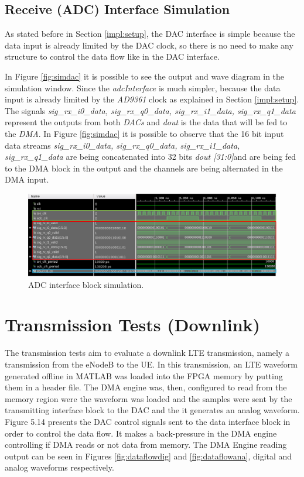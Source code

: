 \subsection{Receive (ADC) Interface Simulation}

As stated before in Section \ref{impl:setup}, the DAC interface is simple
because the data input is already limited by the DAC clock, so there is no need
to make any structure to control the data flow like in the DAC interface.

In Figure \ref{fig:simdac} it is possible to see the output and wave diagram in
the simulation window. Since the \textit{adcInterface} is much simpler, because
the data input is already limited by the \textit{AD9361} clock as explained in
Section \ref{impl:setup}. The signals \textit{sig\_rx\_i0\_data,
sig\_rx\_q0\_data, sig\_rx\_i1\_data, sig\_rx\_q1\_data} represent the outputs
from both \textit{DACs} and \textit{dout} is the data that will be fed to the
\textit{DMA}. In Figure \ref{fig:simdac} it is possible to observe that the 16
bit input data streams \textit{sig\_rx\_i0\_data, sig\_rx\_q0\_data,
sig\_rx\_i1\_data, sig\_rx\_q1\_data} are being concatenated into 32 bits
\textit{dout [31:0]}and are being fed to the DMA block in the output and the
channels are being alternated in the DMA input.

\begin{figure}[htbp]
    \centering
    \includegraphics[width=1\textwidth]{./figures/adcInterface_m}
    \caption{ ADC interface block simulation.
    \label{fig:simadc}}
\end{figure}



\section{Transmission Tests (Downlink)}
\label{result:dac}

The transmission tests aim to evaluate a downlink LTE transmission, namely a
transmission from the eNodeB to the UE. In this transmission, an LTE waveform
generated offline in MATLAB was loaded into the FPGA memory by putting them in a
header file. The DMA engine was, then, configured to read from the memory region
were the waveform was loaded and the samples were sent by the transmitting
interface block to the DAC and the it generates an analog waveform. Figure 5.14
presents the DAC control signals sent to the data interface block in order to
control the data flow. It makes a back-pressure in the DMA engine controlling if
DMA reads or not data from memory. The DMA Engine reading output can be seen in
Figures \ref{fig:dataflowdig} and \ref{fig:dataflowana}, digital and analog
waveforms respectively.

